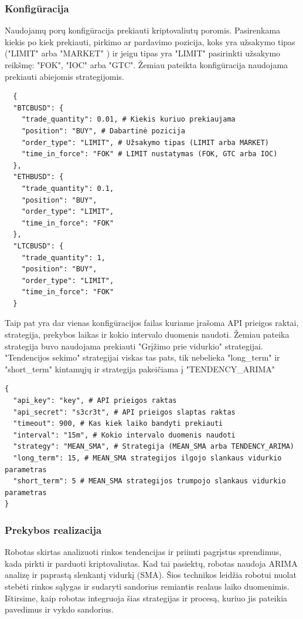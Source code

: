 \documentclass{VUMIFInfKursinis}
\begin{document}
\subsubsection{Konfigūracija}
Naudojamų porų konfigūracija prekiauti kriptovaliutų poromis. Pasirenkama kiekis po kiek prekiauti, pirkimo ar pardavimo pozicija, koks yra užsakymo
tipas ("LIMIT" arba "MARKET" ) ir jeigu tipas yra "LIMIT" pasirinkti užsakymo reikšmę: "FOK", "IOC" arba "GTC". Žemiau pateikta konfigūracija naudojama 
prekiauti abiejomis strategijomis.

\begin{verbatim}
  {
  "BTCBUSD": {
    "trade_quantity": 0.01, # Kiekis kuriuo prekiaujama
    "position": "BUY", # Dabartinė pozicija
    "order_type": "LIMIT", # Užsakymo tipas (LIMIT arba MARKET)
    "time_in_force": "FOK" # LIMIT nustatymas (FOK, GTC arba IOC)
  },
  "ETHBUSD": {
    "trade_quantity": 0.1,
    "position": "BUY",
    "order_type": "LIMIT",
    "time_in_force": "FOK"
  },
  "LTCBUSD": {
    "trade_quantity": 1,
    "position": "BUY",
    "order_type": "LIMIT",
    "time_in_force": "FOK"
  }
\end{verbatim}

Taip pat yra dar vienas konfigūracijos failas kuriame įrašoma API prieigos raktai, strategija, prekybos laikas ir kokio intervalo duomenis naudoti. Žemiau pateika 
strategija buvo naudojama prekiauti "Grįžimo prie vidurkio" strategijai. "Tendencijos sekimo" strategijai viskas tas pats, tik nebelieka "long\_term" ir "short\_term"
kintamųjų ir strategija pakeičiama į "TENDENCY\_ARIMA" 

\begin{verbatim}
{
  "api_key": "key", # API prieigos raktas
  "api_secret": "s3cr3t", # API prieigos slaptas raktas
  "timeout": 900, # Kas kiek laiko bandyti prekiauti
  "interval": "15m", # Kokio intervalo duomenis naudoti
  "strategy": "MEAN_SMA", # Strategija (MEAN_SMA arba TENDENCY_ARIMA)
  "long_term": 15, # MEAN_SMA strategijos ilgojo slankaus vidurkio parametras
  "short_term": 5 # MEAN_SMA strategijos trumpojo slankaus vidurkio parametras
}
\end{verbatim}

\subsubsection{Prekybos realizacija}
Robotas skirtas analizuoti rinkos tendencijas ir priimti pagrįstus sprendimus, kada pirkti ir parduoti kriptovaliutas. 
Kad tai pasiektų, robotas naudoja ARIMA analizę ir paprastą slenkantį vidurkį (SMA).
Šios technikos leidžia robotui nuolat stebėti rinkos sąlygas ir sudaryti sandorius remiantis realaus laiko duomenimis. 
Ištirsime, kaip robotas integruoja šias strategijas ir procesą, kuriuo jis pateikia pavedimus ir vykdo sandorius.
\end{document}
